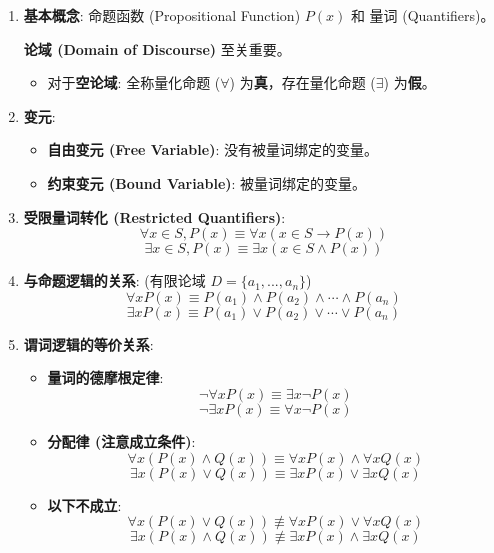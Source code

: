 \documentclass[a4paper,12pt]{ctexart}
\begin{document}
\begin{enumerate}
    \item \textbf{基本概念}: 命题函数 (Propositional Function) $P(x)$ 和 量词 (Quantifiers)。
    \begin{mynote}
        \textbf{论域 (Domain of Discourse)} 至关重要。
        \begin{itemize}
            \item 对于\textbf{空论域}: 全称量化命题 ($\forall$) 为\textbf{真}，存在量化命题 ($\exists$) 为\textbf{假}。
        \end{itemize}
    \end{mynote}
    \item \textbf{变元}:
    \begin{itemize}
        \item \textbf{自由变元 (Free Variable)}: 没有被量词绑定的变量。
        \item \textbf{约束变元 (Bound Variable)}: 被量词绑定的变量。
    \end{itemize}

    \item \textbf{受限量词转化 (Restricted Quantifiers)}:
    $$\forall x \in S, P(x) \equiv \forall x (x \in S \to P(x))$$
    $$\exists x \in S, P(x) \equiv \exists x (x \in S \land P(x))$$

    \item \textbf{与命题逻辑的关系}: (有限论域 $D = \{a_1, ..., a_n\}$)
    $$ \forall x P(x) \equiv P(a_1) \land P(a_2) \land \cdots \land P(a_n) $$
    $$ \exists x P(x) \equiv P(a_1) \lor P(a_2) \lor \cdots \lor P(a_n) $$

    \item \textbf{谓词逻辑的等价关系}:
    \begin{itemize}
        \item \textbf{量词的德摩根定律}:
        $$\neg \forall x P(x) \equiv \exists x \neg P(x)$$
        $$\neg \exists x P(x) \equiv \forall x \neg P(x)$$
        \item \textbf{分配律 (注意成立条件)}:
        $$\forall x (P(x) \land Q(x)) \equiv \forall x P(x) \land \forall x Q(x)$$
        $$\exists x (P(x) \lor Q(x)) \equiv \exists x P(x) \lor \exists x Q(x)$$
        \item \textbf{以下不成立}:
        $$\forall x (P(x) \lor Q(x)) \not\equiv \forall x P(x) \lor \forall x Q(x)$$
        $$\exists x (P(x) \land Q(x)) \not\equiv \exists x P(x) \land \exists x Q(x)$$
    \end{itemize}


\end{enumerate}
\end{document}
